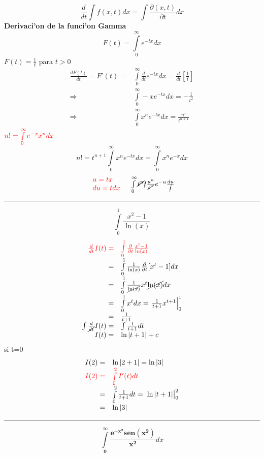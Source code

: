 \documentclass{article}
\theoremstyle{definition}
\begin{document}
\[\frac{d}{dt}\int f(x,t)dx=\int\frac{\partial (x,t)}{\partial t}dx\]
\textbf{Derivaci'on de la funci'on Gamma}
\[F(t)=\int\limits^{\infty}_0e^{-tx}dx\]
$F(t)=\frac{1}{t}$ para $t>0$
\[
\begin{array}{rl}
	\frac{dF(t)}{dt}=F'(t)=& \int\limits^{\infty}_0\frac{d}{dt}e^{-tx}dx=\frac{d}{dt}\left[\frac{1}{t}\right]\\
	\Rightarrow & \int\limits^{\infty}_0-xe^{-tx}dx=-\frac{1}{t^2}\\
	\Rightarrow & \int\limits^{\infty}_0x^ne^{-tx}dx=\frac{n!}{t^{n+1}}
\end{array}
\]
$\textcolor{red}{n!=\int\limits^{\infty}_0e^{-x}x^ndx}$
\[n!=t^{n+1}\int\limits^{\infty}_0x^ne^{-tx}dx=\int\limits^{\infty}_0x^ne^{-x}dx\]
\[\begin{array}{lr}
	\textcolor{red}{\begin{array}{l}
		u=tx\\
		du=tdx
	\end{array}} & \int\limits^{\infty}_0\cancel{t^n}\cancel{t}\frac{u^n}{\cancel{t^n}}e^{-u}\frac{du}{\cancel{t}}
\end{array}\]
\par\noindent\rule{\textwidth}{0.5pt}
\[\int\limits^{1}_0\frac{x^2-1}{\ln (x)}\]
\[
\begin{array}{rl}
	\textcolor{red}{\frac{d}{dt} I(t)=}&\textcolor{red}{\int\limits^{1}_0\frac{\partial}{\partial t}\frac{x^t-1}{\ln (x)}}\\
	=&\int\limits^{1}_0\frac{1}{\ln (x)}\frac{\partial}{\partial t}[x^t-1]dx\\
	=&\int\limits^{1}_0\frac{1}{\cancel{\ln (x)}}x^t\cancel{\ln (x)}dx\\
	=&\int\limits^{1}_0x^tdx=\left.\frac{1}{t+1}x^{t+1}\right|^1_0\\
	=&\frac{1}{t+1}\\
	\int\frac{d}{\cancel{dt}}I(t)=& \int \frac{1}{t+1}dt\\
	I(t)=& \ln |t+1|+c
\end{array}
\]
si t=0
\[\begin{array}{rl}
	I(2)=& \ln |2+1|=\ln |3|\\
	\textcolor{red}{I(2)=}&\textcolor{red}{\int\limits^2_0 I'(t)dt}\\
	=& \int\limits^2_0 \frac{1}{t+1} dt=\left.\vphantom{\frac{0}{0}}\ln |t+1|\right|^2_0\\
	= & \ln |3|
\end{array}\]
\par\noindent\rule{\textwidth}{0.5pt}
\[\mathbf{\int\limits^{\infty}_0\frac{e^{-x^2}sen(x^2)}{x^2}}dx\]
\end{document}
